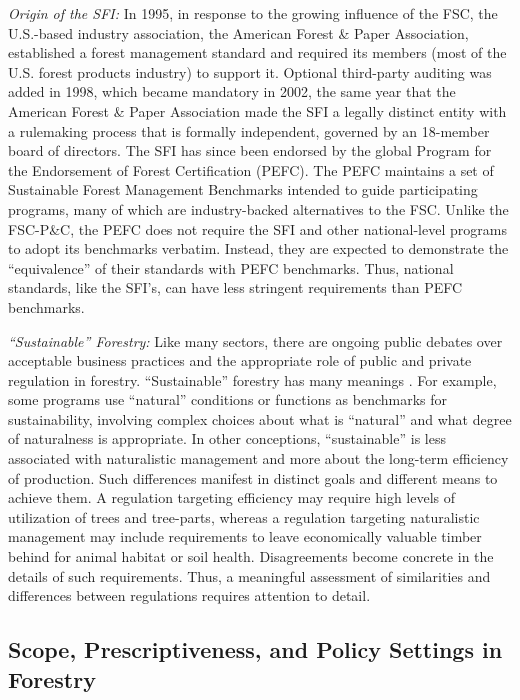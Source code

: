 \documentclass[
      12pt,
            Review ]{article}
\begin{document}
\emph{Origin of the SFI:} In 1995, in response to the growing influence of the FSC, the U.S.-based industry association, the American Forest \& Paper Association, established a forest management standard and required its members (most of the U.S. forest products industry) to support it. Optional third-party auditing was added in 1998, which became mandatory in 2002, the same year that the American Forest \& Paper Association made the SFI a legally distinct entity with a rulemaking process that is formally independent, governed by an 18-member board of directors. The SFI has since been endorsed by the global Program for the Endorsement of Forest Certification (PEFC). The PEFC maintains a set of Sustainable Forest Management Benchmarks intended to guide participating programs, many of which are industry-backed alternatives to the FSC. Unlike the FSC-P\&C, the PEFC does not require the SFI and other national-level programs to adopt its benchmarks verbatim. Instead, they are expected to demonstrate the ``equivalence'' of their standards with PEFC benchmarks. Thus, national standards, like the SFI's, can have less stringent requirements than PEFC benchmarks.

\emph{``Sustainable'' Forestry:} Like many sectors, there are ongoing public debates over acceptable business practices and the appropriate role of public and private regulation in forestry. ``Sustainable'' forestry has many meanings \citep{McDermott2012}. For example, some programs use ``natural'' conditions or functions as benchmarks for sustainability, involving complex choices about what is ``natural'' and what degree of naturalness is appropriate. In other conceptions, ``sustainable'' is less associated with naturalistic management and more about the long-term efficiency of production. Such differences manifest in distinct goals and different means to achieve them. A regulation targeting efficiency may require high levels of utilization of trees and tree-parts, whereas a regulation targeting naturalistic management may include requirements to leave economically valuable timber behind for animal habitat or soil health. Disagreements become concrete in the details of such requirements. Thus, a meaningful assessment of similarities and differences between regulations requires attention to detail.

\hypertarget{scope-prescriptiveness-and-policy-settings-in-forestry}{%
\subsection{Scope, Prescriptiveness, and Policy Settings in Forestry}\label{scope-prescriptiveness-and-policy-settings-in-forestry}}
\end{document}
